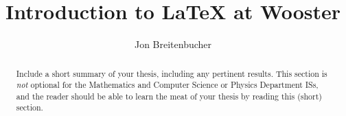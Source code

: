 \documentclass[10pt,palatino,code,picins,kaukecopyright,openright,woolshort,dropcaps,verbatim,index,euler]{woosterthesis}
\title{Introduction to \LaTeX{} at Wooster}
\author{Jon Breitenbucher}
\begin{document}

\frontmatter
\maketitle
\ClearShipoutPicture
\clearpage\thispagestyle{empty}\null\clearpage
\disscopyright 

%                                                                                       
%                                                                                       

\begin{abstract}
Include a short summary of your thesis, including any pertinent results.  This section is \emph{not} optional for the Mathematics and Computer Science or Physics Department ISs, and the reader should be able to learn the meat of your thesis by reading this (short) section.
\end{abstract}

%                                                                                       
%                                                                                       

\dedication{This work is dedicated to the future generations of Wooster students.}


%                                                                                       
%                                                                                       
\end{document}
